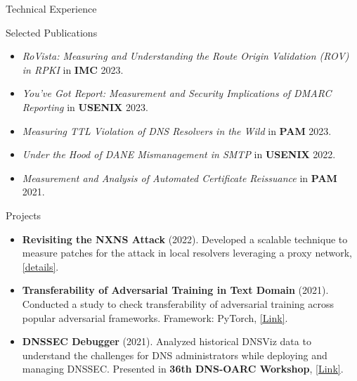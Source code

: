 \documentclass[]{mcdowellcv}
\begin{document}
	\begin{cvsection}{Technical Experience}
		\begin{cvsubsection}{Selected Publications}{}{}
			\begin{itemize}
				\item \textit{RoVista: Measuring and Understanding the Route Origin Validation (ROV) in RPKI} in \textbf{IMC} 2023. %
				\item \textit{You’ve Got Report: Measurement and Security Implications of DMARC Reporting} in \textbf{USENIX} 2023. %
				\item \textit{Measuring TTL Violation of DNS Resolvers in the Wild} in \textbf{PAM} 2023. %
				\item \textit{Under the Hood of DANE Mismanagement in SMTP} in \textbf{USENIX} 2022. %
				\item \textit{Measurement and Analysis of Automated Certificate Reissuance} in \textbf{PAM} 2021.
			\end{itemize}
		\end{cvsubsection}
		\begin{cvsubsection}{Projects}{}{}
			\begin{itemize}
				\item \textbf{Revisiting the NXNS Attack} (2022). Developed a scalable technique to measure patches for the attack in local resolvers leveraging a proxy network, \href{https://drive.google.com/file/d/1kuTSIHuNUYxmIKbR6MsSg3znMqx55mCP/view}{[details]}.
				\item \textbf{Transferability of Adversarial Training in Text Domain} (2021). Conducted a study to check transferability of adversarial training across popular adversarial frameworks. Framework: PyTorch, \href{https://github.com/Ashiq5/AdvTrainingExperiment}{[Link]}.
				\item \textbf{DNSSEC Debugger} (2021).  Analyzed historical DNSViz data to understand the challenges for DNS administrators while deploying and managing DNSSEC. Presented in \textbf{36th DNS-OARC Workshop}, \href{https://indico.dns-oarc.net/event/40/contributions/891/attachments/857/1555/DNS-OARC-final.pdf}{[Link]}.
			\end{itemize}
		\end{cvsubsection}
	\end{cvsection}
	
\end{document}
